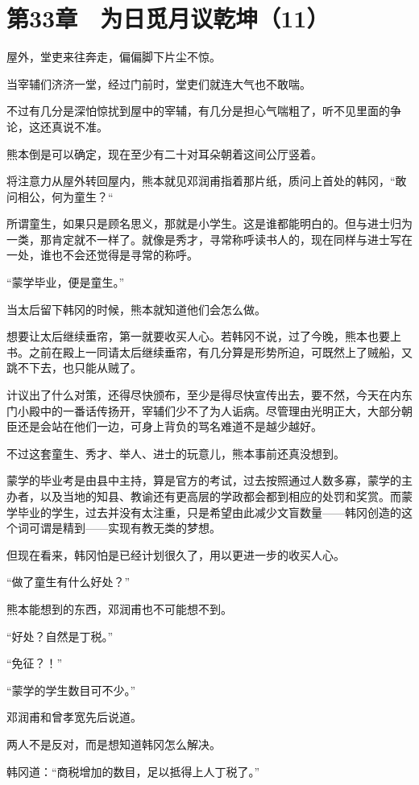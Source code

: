 \section{第33章　为日觅月议乾坤（11）}

屋外，堂吏来往奔走，偏偏脚下片尘不惊。

当宰辅们济济一堂，经过门前时，堂吏们就连大气也不敢喘。

不过有几分是深怕惊扰到屋中的宰辅，有几分是担心气喘粗了，听不见里面的争论，这还真说不准。

熊本倒是可以确定，现在至少有二十对耳朵朝着这间公厅竖着。

将注意力从屋外转回屋内，熊本就见邓润甫指着那片纸，质问上首处的韩冈，“敢问相公，何为童生？“

所谓童生，如果只是顾名思义，那就是小学生。这是谁都能明白的。但与进士归为一类，那肯定就不一样了。就像是秀才，寻常称呼读书人的，现在同样与进士写在一处，谁也不会还觉得是寻常的称呼。

“蒙学毕业，便是童生。”

当太后留下韩冈的时候，熊本就知道他们会怎么做。

想要让太后继续垂帘，第一就要收买人心。若韩冈不说，过了今晚，熊本也要上书。之前在殿上一同请太后继续垂帘，有几分算是形势所迫，可既然上了贼船，又跳不下去，也只能从贼了。

计议出了什么对策，还得尽快颁布，至少是得尽快宣传出去，要不然，今天在内东门小殿中的一番话传扬开，宰辅们少不了为人诟病。尽管理由光明正大，大部分朝臣还是会站在他们一边，可身上背负的骂名难道不是越少越好。

不过这套童生、秀才、举人、进士的玩意儿，熊本事前还真没想到。

蒙学的毕业考是由县中主持，算是官方的考试，过去按照通过人数多寡，蒙学的主办者，以及当地的知县、教谕还有更高层的学政都会都到相应的处罚和奖赏。而蒙学毕业的学生，过去并没有太注重，只是希望由此减少文盲数量——韩冈创造的这个词可谓是精到——实现有教无类的梦想。

但现在看来，韩冈怕是已经计划很久了，用以更进一步的收买人心。

“做了童生有什么好处？”

熊本能想到的东西，邓润甫也不可能想不到。

“好处？自然是丁税。”

“免征？！”

“蒙学的学生数目可不少。”

邓润甫和曾孝宽先后说道。

两人不是反对，而是想知道韩冈怎么解决。

韩冈道：“商税增加的数目，足以抵得上人丁税了。”

